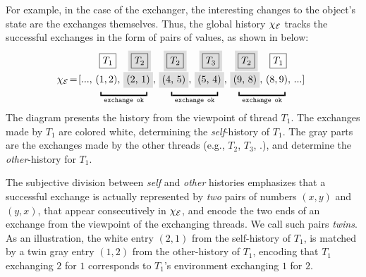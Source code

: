 %
%

For example, in the case of the exchanger, the interesting changes to
the object's state are the exchanges themselves. Thus, the global
history $\chi_{\cal E}$ tracks the successful exchanges in the form
of pairs of values, as shown in below:
%
\[
\!\!\!\begin{array}{r@{\ }c@{}c@{\ }c@{\ }c@{\ }c@{\ }c@{\ }c@{\ }c@{}l}
  & & \boxed{T_1} & \graybox{\boxed{T_2}} & \graybox{\boxed{T_2}} & \graybox{\boxed{T_3}} & \graybox{\boxed{T_2}}
  & \boxed{T_1} 
  \\[5pt]  
  \hist_{\cal E} \!=\! \text{[} &\!\!...,~& (1, 2), & \graybox{(2, 1)}, & 
                                 \graybox{(4, 5)}, & \graybox{(5, 4)}, &  \graybox{(9, 8)}, & (8, 9), &
                                                                          ...
                     &
                       \text{]}   
\\[-5pt]   
&& \multicolumn{2}{l}{\underbracket{\phantom{aaaaaaaaa}}_{\mathtt{exchange~ok}}} & \multicolumn{2}{c}{\underbracket{\phantom{aaaaaaaaa}}_{\mathtt{exchange~ok}}} & \multicolumn{2}{c}{\underbracket{\phantom{aaaaaaaaa}}_{\mathtt{exchange~ok}}}
                  & & 
\end{array}
\]
%
%
The diagram presents the history from the viewpoint of thread
$T_1$. The exchanges made by $T_1$ are colored white, determining the
\emph{self}-history of $T_1$. The gray parts are the exchanges made by
the other threads (e.g., $T_2$, $T_3$, \etc.), and determine the
\emph{other}-history for $T_1$. 



The subjective division between \emph{self} and \emph{other} histories
emphasizes that a successful exchange is actually represented by
\emph{two} pairs of numbers $(x, y)$ and $(y, x)$, that appear
consecutively in $\chi_{\cal E}$, and encode the two ends of an
exchange from the viewpoint of the exchanging threads. We call such
pairs \emph{twins}.
%
As an illustration, the white entry $(2, 1)$ from the self-history of
$T_1$, is matched by a twin gray entry $(1, 2)$ from the other-history
of $T_1$, encoding that $T_1$ exchanging $2$ for $1$ corresponds to
$T_1$'s environment exchanging $1$ for $2$.


